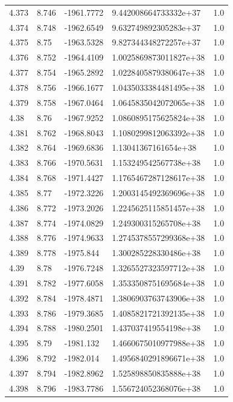 \begin{tabular}{lllll}
4.373 & 8.746 & -1961.7772 & 9.442008664733332e+37 & 1.0 \\
4.374 & 8.748 & -1962.6549 & 9.632749892305283e+37 & 1.0 \\
4.375 & 8.75 & -1963.5328 & 9.827344348272257e+37 & 1.0 \\
4.376 & 8.752 & -1964.4109 & 1.0025869873011827e+38 & 1.0 \\
4.377 & 8.754 & -1965.2892 & 1.0228405879380647e+38 & 1.0 \\
4.378 & 8.756 & -1966.1677 & 1.0435033384481495e+38 & 1.0 \\
4.379 & 8.758 & -1967.0464 & 1.0645835042072065e+38 & 1.0 \\
4.38 & 8.76 & -1967.9252 & 1.0860895175625824e+38 & 1.0 \\
4.381 & 8.762 & -1968.8043 & 1.1080299812063392e+38 & 1.0 \\
4.382 & 8.764 & -1969.6836 & 1.13041367161654e+38 & 1.0 \\
4.383 & 8.766 & -1970.5631 & 1.153249542567738e+38 & 1.0 \\
4.384 & 8.768 & -1971.4427 & 1.1765467287128617e+38 & 1.0 \\
4.385 & 8.77 & -1972.3226 & 1.2003145492369696e+38 & 1.0 \\
4.386 & 8.772 & -1973.2026 & 1.2245625115851457e+38 & 1.0 \\
4.387 & 8.774 & -1974.0829 & 1.249300315265708e+38 & 1.0 \\
4.388 & 8.776 & -1974.9633 & 1.2745378557299368e+38 & 1.0 \\
4.389 & 8.778 & -1975.844 & 1.300285228330486e+38 & 1.0 \\
4.39 & 8.78 & -1976.7248 & 1.3265527323597712e+38 & 1.0 \\
4.391 & 8.782 & -1977.6058 & 1.3533508751695684e+38 & 1.0 \\
4.392 & 8.784 & -1978.4871 & 1.3806903763743906e+38 & 1.0 \\
4.393 & 8.786 & -1979.3685 & 1.4085821721392135e+38 & 1.0 \\
4.394 & 8.788 & -1980.2501 & 1.437037419554198e+38 & 1.0 \\
4.395 & 8.79 & -1981.132 & 1.4660675010977988e+38 & 1.0 \\
4.396 & 8.792 & -1982.014 & 1.4956840291896671e+38 & 1.0 \\
4.397 & 8.794 & -1982.8962 & 1.525898850835888e+38 & 1.0 \\
4.398 & 8.796 & -1983.7786 & 1.556724052368076e+38 & 1.0 \\

\end{tabular}
